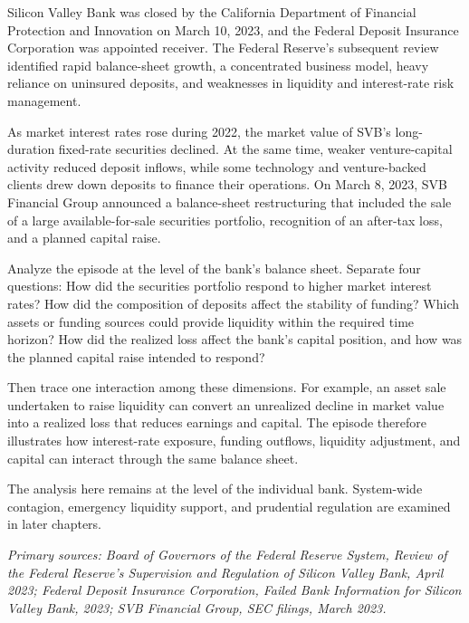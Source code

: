 Silicon Valley Bank was closed by the California Department of Financial
Protection and Innovation on March 10, 2023, and the Federal Deposit Insurance
Corporation was appointed receiver. The Federal Reserve's subsequent review
identified rapid balance-sheet growth, a concentrated business model, heavy
reliance on uninsured deposits, and weaknesses in liquidity and interest-rate
risk management.

As market interest rates rose during 2022, the market value of SVB's
long-duration fixed-rate securities declined. At the same time, weaker
venture-capital activity reduced deposit inflows, while some technology and
venture-backed clients drew down deposits to finance their operations. On
March 8, 2023, SVB Financial Group announced a balance-sheet restructuring
that included the sale of a large available-for-sale securities portfolio,
recognition of an after-tax loss, and a planned capital raise.

Analyze the episode at the level of the bank's balance sheet. Separate four
questions: How did the securities portfolio respond to higher market interest
rates? How did the composition of deposits affect the stability of funding?
Which assets or funding sources could provide liquidity within the required
time horizon? How did the realized loss affect the bank's capital position,
and how was the planned capital raise intended to respond?

Then trace one interaction among these dimensions. For example, an asset sale
undertaken to raise liquidity can convert an unrealized decline in market value
into a realized loss that reduces earnings and capital. The episode therefore
illustrates how interest-rate exposure, funding outflows, liquidity adjustment,
and capital can interact through the same balance sheet.

The analysis here remains at the level of the individual bank. System-wide
contagion, emergency liquidity support, and prudential regulation are examined
in later chapters.

\emph{Primary sources: Board of Governors of the Federal Reserve System,
Review of the Federal Reserve's Supervision and Regulation of Silicon Valley
Bank, April 2023; Federal Deposit Insurance Corporation, Failed Bank Information
for Silicon Valley Bank, 2023; SVB Financial Group, SEC filings, March 2023.}


